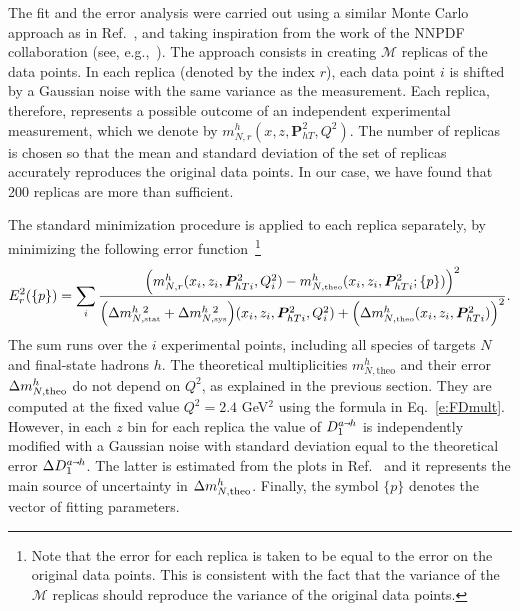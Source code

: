 \documentclass[aps,preprintnumbers,showpacs,nofootinbib,superscriptaddress,floatfix]{revtex4}
\newcommand{\smarrow}{\mbox{\raisebox{-4.5pt}[0pt][0pt]{$\hspace{-1pt} 
		\vec{\phantom{v}}$}}}
\newcommand{\Tperp}{T}
\begin{document}
The fit and the error analysis were carried out using a similar Monte Carlo approach as in Ref.~\cite{Bacchetta:2012ty}, and taking
inspiration from the work of the NNPDF collaboration (see, e.g.,~\cite{Forte:2002fg,Ball:2008by,Ball:2010de}). The approach consists in creating $\mathcal{M}$ replicas of the data points. In each replica (denoted
by the index $r$), each data point $i$ is shifted by a Gaussian noise with the
same variance as the measurement. Each replica, therefore, represents a
possible outcome of an independent experimental measurement, which we denote
by $m_{N, r}^{h}(x, z, \bm{P}_{h\Tperp}^2, Q^2)$. The number of replicas is
chosen so that the mean and standard deviation of the set of replicas
accurately reproduces the original data points. In our case, we have found
that 200 replicas are more than sufficient.

The standard minimization procedure is applied to each replica separately, by
minimizing the following error  
function~\footnote{Note that the error for each replica is taken to be equal
  to the error on the original data points. This is consistent with the fact
  that the variance of the $\mathcal{M}$ replicas should reproduce the
  variance of the original data points.}  
\begin{equation}
E_r^2(\{p\})=\sum_{i} 
\frac{\Bigl(m_{N, r}^{h}(x_i, z_i, \bm{P}_{h\Tperp i}^2, Q_i^2) - m_{N,  \mbox{\tiny theo}}^{h}(x_i, z_i, \bm{P}_{h\Tperp i}^2; \{p\})\Bigr)^2}
        {\Bigl( \Delta m_{N, \mbox{\tiny stat}}^{h\ 2} + \Delta m_{N, \mbox{\tiny sys}}^{h\ 2} \Bigr)(x_i, z_i, \bm{P}_{h\Tperp i}^2, Q^2_i) +\Bigl(\Delta m_{N, \mbox{\tiny theo}}^{h}(x_i, z_i, \bm{P}_{h\Tperp i}^2) \Bigr)^2}   . 
\label{e:MC_chi2}
\end{equation}
The sum runs over the $i$ experimental points, including all species of
targets $N$ and final-state hadrons $h$. The theoretical multiplicities $m_{N,
  \text{theo}}^{h}$ and their error $\Delta m_{N,  {\rm theo}}^{h}$ do not
depend on $Q^2$, as explained in the previous section. They are computed at
the fixed value $Q^2=2.4$ GeV$^2$ using the formula in
Eq.~\eqref{e:FDmult}. However, in each $z$ bin for each replica the value of
$D_1^{a \smarrow h}$ is independently modified with a Gaussian noise with
standard deviation equal to the theoretical error $\Delta D_1^{a\smarrow
  h}$. The latter is estimated from the plots in Ref.~\cite{Epele:2012vg} and
it represents the main source of uncertainty in $\Delta m_{N,  {\rm
    theo}}^{h}$. Finally, the symbol $\{p\}$ denotes the vector of fitting
parameters.  
\end{document}
